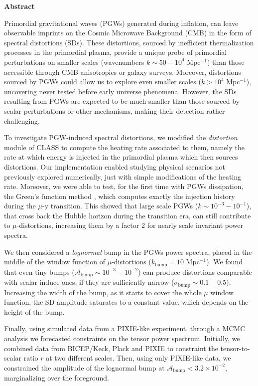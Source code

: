 \vspace*{10pt}
\begin{center}
	\large\textbf{Abstract}\normalsize
\end{center}
\vspace*{10pt}
\begin{adjustwidth}{1cm}{1cm}
Primordial gravitational waves (PGWs) generated during inflation, can leave observable imprints on
the Cosmic Microwave Background (CMB) in the form of spectral distortions (SDs). These distortions,
sourced by inefficient thermalization processes in the primordial plasma, provide a unique probe of
primordial perturbations on smaller scales (wavenumbers $k \sim 50 - 10^{4}$ Mpc$^{-1}$) than those accessible
through CMB anisotropies or galaxy surveys. Moreover, distortions sourced by PGWs could allow us to
explore even smaller scales ($k > 10^{4}$ Mpc$^{-1}$), uncovering never tested before early universe phenomena. However, the SDs resulting from PGWs are expected to be much smaller than those sourced by scalar perturbations or other mechanisms, making their detection rather challenging.

To investigate PGW-induced spectral distortions, we modified the \emph{distortion} module of CLASS to compute the heating rate associated to them, namely the rate at which energy is injected in the primordial plasma which then sources distortions. Our implementation enabled studying physical
scenarios not previously explored numerically, just with simple modifications of the heating rate. Moreover, we were able to test, for the first time with PGWs dissipation, the Green’s function method \cite{Chluba_Green}, which computes exactly the injection history during the $\mu$-y transition. This showed that large scale PGWs ($k\sim 10^{-3}-10^{-1}$), that cross back the Hubble horizon during the transition era, can still contribute to $\mu$-distortions, increasing them by a factor 2 for nearly scale invariant power spectra.

We then considered a \emph{lognormal} bump in the PGWs power spectra, placed in the middle of the window function of $\mu$-distortions ($k_\text{bump}=10$ Mpc$^{-1}$). We found that even tiny bumps ($\mathcal{A}_\text{bump}\sim 10^{-3}-10^{-2}$) can produce distortions comparable with scalar-induce ones, if they are sufficiently narrow ($\sigma_\text{bump}\sim 0.1-0.5$). Increasing the width of the bump, as it starts to cover the whole $\mu$ window function, the SD amplitude saturates to a constant value, which depends on the height of the bump. 

Finally, using simulated data from a PIXIE-like experiment, through a MCMC analysis we forecasted constraints on the tensor power spectrum. Initially, we combined data from BICEP/Keck, Plack and PIXIE to constraint the tensor-to-scalar ratio $r$ at two different scales. Then, using only PIXIE-like data, we constrained the amplitude of the lognormal bump at $\mathcal{A}_\text{bump}<3.2\times10^{-2}$, marginalizing over the foreground.

\end{adjustwidth}